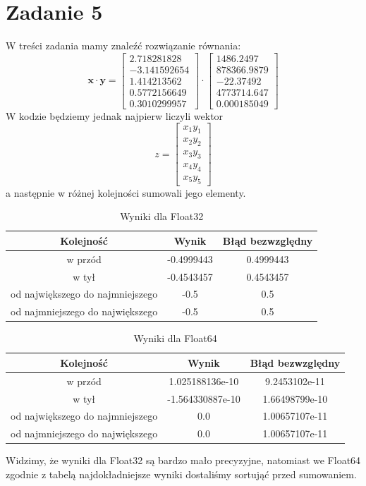 \documentclass{article}
\begin{document}
\section*{Zadanie 5}
W treści zadania mamy znaleźć rozwiązanie równania:
\[
\mathbf{x} \cdot \mathbf{y} = 
\begin{bmatrix}
2.718281828 \\
-3.141592654 \\
1.414213562 \\
0.5772156649 \\
0.3010299957
\end{bmatrix} \cdot
\begin{bmatrix}
1486.2497 \\
878366.9879 \\
-22.37492 \\
4773714.647 \\
0.000185049
\end{bmatrix}
\]
W kodzie będziemy jednak najpierw liczyli wektor
\[
  z = \begin{bmatrix}
    x_1y_1\\
    x_2y_2\\x_3y_3\\
    x_4y_4\\
    x_5y_5
    \end{bmatrix}
    \]
a następnie w różnej kolejności sumowali jego elementy.
{
\begin{table}[H]
  \centering
  \begin{tabular}{|c|c|c|}
    \toprule
    Kolejność & Wynik & Błąd bezwzględny\\
    \midrule
    w przód & -0.4999443 & 0.4999443 \\
    w tył & -0.4543457 & 0.4543457 \\
    od największego do najmniejszego & -0.5 & 0.5 \\
    od najmniejszego do największego & -0.5 & 0.5 \\
    \bottomrule
  \end{tabular}
  \caption{Wyniki dla Float32}
\end{table}
}
{
\begin{table}[H]
  \centering
  \begin{tabular}{|c|c|c|}
    \toprule
    Kolejność & Wynik & Błąd bezwzględny\\
    \midrule
    w przód & 1.025188136e-10 & 9.2453102e-11 \\
    w tył & -1.564330887e-10 & 1.66498799e-10 \\
    od największego do najmniejszego & 0.0 & 1.00657107e-11 \\
    od najmniejszego do największego & 0.0 & 1.00657107e-11 \\
    \bottomrule
  \end{tabular}
  \caption{Wyniki dla Float64}
\end{table}
}
Widzimy, że wyniki dla Float32 są bardzo mało precyzyjne,
natomiast we Float64 zgodnie z tabelą
najdokładniejsze wyniki dostaliśmy sortująć przed sumowaniem.
\end{document}

